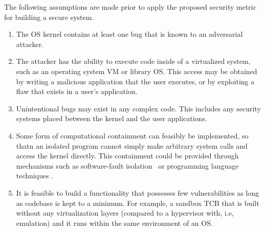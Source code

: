 The following assumptions are made prior to apply the proposed security metric for building %
a secure system.

\begin{enumerate}
\item The OS kernel contains at least one bug that is known to an adversarial attacker.

\item The attacker has the ability to execute code inside
of a virtualized system, such as an operating system VM or library OS.
This access may be obtained by writing a malicious application
that the user executes, or by exploiting a flaw that exists in a user's
application.

\item Unintentional bugs may exist in any complex code. This
includes any security systems placed between the kernel and the user
applications.

\item Some form of computational containment can feasibly be implemented, so thatn an isolated program cannot simply
make arbitrary system calls and access the kernel directly. This containment could
be provided through mechanisms such as software-fault isolation~\cite{SFI:93} or programming
language techniques \cite{JS-Sandboxing1,JVM}. %

\item It is feasible to build a functionality that possesses few vulnerabilities as long as codebase is kept to a minimum. For example, a sandbox TCB that is built without any virtualization layers (compared to a hypervisor with, i.e, emulation) and it runs within the same environment of an OS.

\end{enumerate}